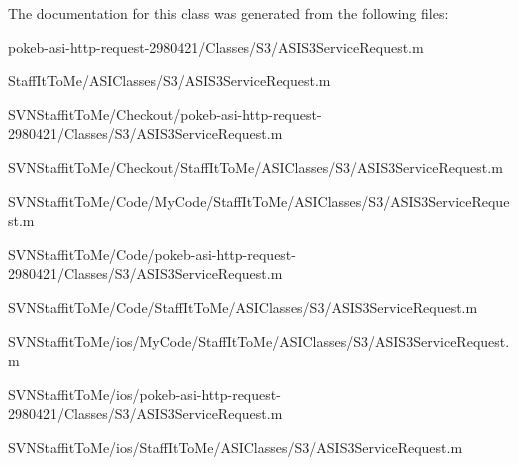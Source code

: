 \-The documentation for this class was generated from the following files\-:\begin{DoxyCompactItemize}
\item 
pokeb-\/asi-\/http-\/request-\/2980421/\-Classes/\-S3/\-A\-S\-I\-S3\-Service\-Request.\-m\item 
\-Staff\-It\-To\-Me/\-A\-S\-I\-Classes/\-S3/\-A\-S\-I\-S3\-Service\-Request.\-m\item 
\-S\-V\-N\-Staffit\-To\-Me/\-Checkout/pokeb-\/asi-\/http-\/request-\/2980421/\-Classes/\-S3/\-A\-S\-I\-S3\-Service\-Request.\-m\item 
\-S\-V\-N\-Staffit\-To\-Me/\-Checkout/\-Staff\-It\-To\-Me/\-A\-S\-I\-Classes/\-S3/\-A\-S\-I\-S3\-Service\-Request.\-m\item 
\-S\-V\-N\-Staffit\-To\-Me/\-Code/\-My\-Code/\-Staff\-It\-To\-Me/\-A\-S\-I\-Classes/\-S3/\-A\-S\-I\-S3\-Service\-Request.\-m\item 
\-S\-V\-N\-Staffit\-To\-Me/\-Code/pokeb-\/asi-\/http-\/request-\/2980421/\-Classes/\-S3/\-A\-S\-I\-S3\-Service\-Request.\-m\item 
\-S\-V\-N\-Staffit\-To\-Me/\-Code/\-Staff\-It\-To\-Me/\-A\-S\-I\-Classes/\-S3/\-A\-S\-I\-S3\-Service\-Request.\-m\item 
\-S\-V\-N\-Staffit\-To\-Me/ios/\-My\-Code/\-Staff\-It\-To\-Me/\-A\-S\-I\-Classes/\-S3/\-A\-S\-I\-S3\-Service\-Request.\-m\item 
\-S\-V\-N\-Staffit\-To\-Me/ios/pokeb-\/asi-\/http-\/request-\/2980421/\-Classes/\-S3/\-A\-S\-I\-S3\-Service\-Request.\-m\item 
\-S\-V\-N\-Staffit\-To\-Me/ios/\-Staff\-It\-To\-Me/\-A\-S\-I\-Classes/\-S3/\-A\-S\-I\-S3\-Service\-Request.\-m\end{DoxyCompactItemize}

